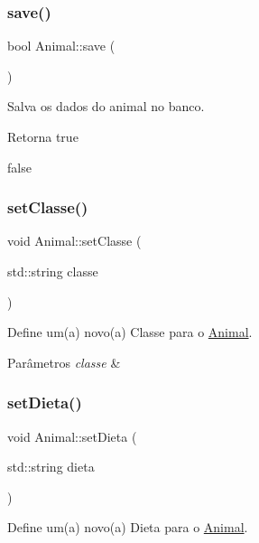 \subsubsection{\texorpdfstring{save()}{save()}}
{\footnotesize\ttfamily bool Animal\+::save (\begin{DoxyParamCaption}{ }\end{DoxyParamCaption})}



Salva os dados do animal no banco. 

\begin{DoxyReturn}{Retorna}
true 

false 
\end{DoxyReturn}
\mbox{\label{classAnimal_ae1956de8a017d0b1cd506935cd1a57e0}} 
\subsubsection{\texorpdfstring{set\+Classe()}{setClasse()}}
{\footnotesize\ttfamily void Animal\+::set\+Classe (\begin{DoxyParamCaption}\item[{std\+::string}]{classe }\end{DoxyParamCaption})}



Define um(a) novo(a) Classe para o \hyperlink{classAnimal}{Animal}. 


\begin{DoxyParams}{Parâmetros}
{\em classe} & \\
\hline
\end{DoxyParams}
\mbox{\label{classAnimal_a1b6ae4e4360c2a3b15c1759a654ef84b}} 
\subsubsection{\texorpdfstring{set\+Dieta()}{setDieta()}}
{\footnotesize\ttfamily void Animal\+::set\+Dieta (\begin{DoxyParamCaption}\item[{std\+::string}]{dieta }\end{DoxyParamCaption})}



Define um(a) novo(a) Dieta para o \hyperlink{classAnimal}{Animal}. 


